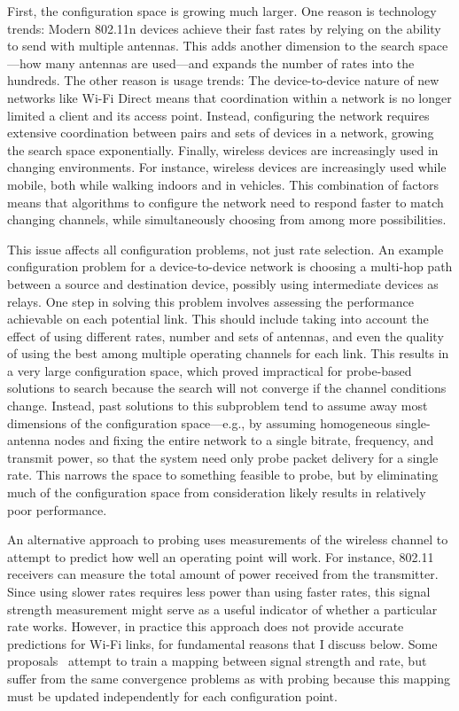 First, the configuration space is growing much larger. One reason is technology trends: Modern 802.11n devices achieve their fast rates by relying on the ability to send with multiple antennas. This adds another dimension to the search space---how many antennas are used---and expands the number of rates into the hundreds. The other reason is usage trends: The device-to-device nature of new networks like Wi-Fi Direct means that coordination within a network is no longer limited a client and its access point. Instead, configuring the network requires extensive coordination between pairs and sets of devices in a network, growing the search space exponentially. Finally, wireless devices are increasingly used in changing environments. For instance, wireless devices are increasingly used while mobile, both while walking indoors and in vehicles. This combination of factors means that algorithms to configure the network need to respond faster to match changing channels, while simultaneously choosing from among more possibilities.

This issue affects all configuration problems, not just rate selection. An example configuration problem for a device-to-device network is choosing a multi-hop path between a source and destination device, possibly using intermediate devices as relays. One step in solving this problem involves assessing the performance achievable on each potential link. This should include taking into account the effect of using different rates, number and sets of antennas, and even the quality of using the best among multiple operating channels for each link. This results in a very large configuration space, which proved impractical for probe-based solutions to search because the search will not converge if the channel conditions change. Instead, past solutions to this subproblem tend to assume away most dimensions of the configuration space---e.g., by assuming homogeneous single-antenna nodes and fixing the entire network to a single bitrate, frequency, and transmit power, so that the system need only probe packet delivery for a single rate. This narrows the space to something feasible to probe, but by eliminating much of the configuration space from consideration likely results in relatively poor performance.

An alternative approach to probing uses measurements of the wireless channel to attempt to predict how well an operating point will work. For instance, 802.11 receivers can measure the total amount of power received from the transmitter. Since using slower rates requires less power than using faster rates, this signal strength measurement might serve as a useful indicator of whether a particular rate works. However, in practice this approach does not provide accurate predictions for Wi-Fi links, for fundamental reasons that I discuss below. Some proposals~\cite{Judd_CHARM} attempt to train a mapping between signal strength and rate, but suffer from the same convergence problems as with probing because this mapping must be updated independently for each configuration point.

